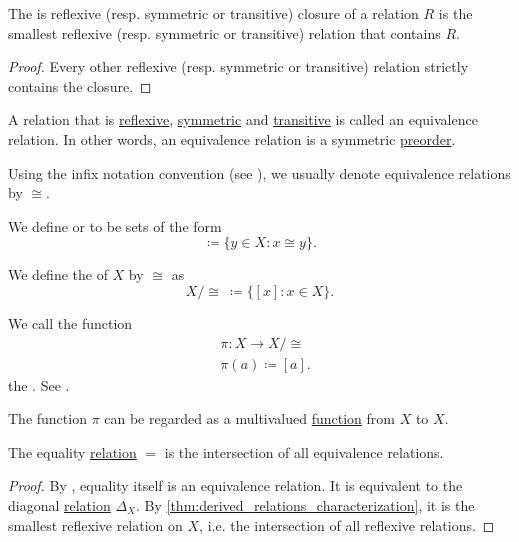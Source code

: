 \begin{proposition}\label{thm:derived_relations_characterization}
  The is reflexive (resp. symmetric or transitive) closure of a relation \( R \) is the smallest reflexive (resp. symmetric or transitive) relation that contains \( R \).
\end{proposition}
\begin{proof}
  Every other reflexive (resp. symmetric or transitive) relation strictly contains the closure.
\end{proof}

\begin{definition}\label{def:equivalence_relation}
  A relation that is \hyperref[def:binary_relation/reflexive]{reflexive}, \hyperref[def:binary_relation/symmetric]{symmetric} and \hyperref[def:binary_relation/transitive]{transitive} is called an equivalence relation. In other words, an equivalence relation is a symmetric \hyperref[def:preordered_set]{preorder}.

  Using the infix notation convention (see ), we usually denote equivalence relations by \( \cong \).

  \begin{defenum}
     We define  or  to be sets of the form
    \begin{equation*}
      [x] \coloneqq \{ y \in X \colon x \cong y \}.
    \end{equation*}

     We define the  of \( X \) by \( \cong \) as
    \begin{equation*}
      X / \cong \ \coloneqq \{ [x] \colon x \in X \}.
    \end{equation*}

     We call the function
    \begin{align*}
      &\pi: X \to X / \cong \\
      &\pi(a) \coloneqq [a].
    \end{align*}
    the . See .

    The function \( \pi \) can be regarded as a multivalued \hyperref[def:function/multivalued]{function} from \( X \) to \( X \).
  \end{defenum}
\end{definition}

\begin{proposition}\label{thm:equality_is_smallest_equivalence_relation}
  The equality \hyperref[def:relation]{relation} \( = \) is the intersection of all equivalence relations.
\end{proposition}
\begin{proof}
  By , equality itself is an equivalence relation. It is equivalent to the diagonal \hyperref[def:binary_relation/diagonal]{relation} \( \Delta_X \). By \cref{thm:derived_relations_characterization}, it is the smallest reflexive relation on \( X \), i.e. the intersection of all reflexive relations.
\end{proof}

